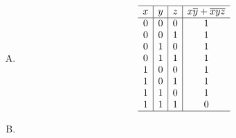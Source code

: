 {{\begin{practices}
\begin{enumerate}[A.]
{\begin{table}[H]
                        \[
                            \begin{array}{c|c|c|c}
                                \hline
                                x & y & z & \overline{x}y + \overline{y}z \\
                                \hline
                                0 & 0 & 0 & 0 \\
                                0 & 0 & 1 & 1 \\
                                0 & 1 & 0 & 1 \\
                                0 & 1 & 1 & 1 \\
                                1 & 0 & 0 & 0 \\
                                1 & 0 & 1 & 1 \\
                                1 & 1 & 0 & 0 \\
                                1 & 1 & 1 & 0 \\
                                \hline
                            \end{array}
                        \]
                    \end{table}
                }
                \item
                {
                    \begin{table}[H]
                        \centering

                        \[
                            \begin{array}{c|c|c|c}
                                \hline
                                x & y & z & x\overline{y} + \overline{xyz} \\
                                \hline
                                0 & 0 & 0 & 1 \\
                                0 & 0 & 1 & 1 \\
                                0 & 1 & 0 & 1 \\
                                0 & 1 & 1 & 1 \\
                                1 & 0 & 0 & 1 \\
                                1 & 0 & 1 & 1 \\
                                1 & 1 & 0 & 1 \\
                                1 & 1 & 1 & 0 \\
                                \hline
                            \end{array}
                        \]
                    \end{table}
                }
                \item
                {
                    \begin{table}[H]
                        \centering


\end{table}}
\end{enumerate}
\end{practices}}}
